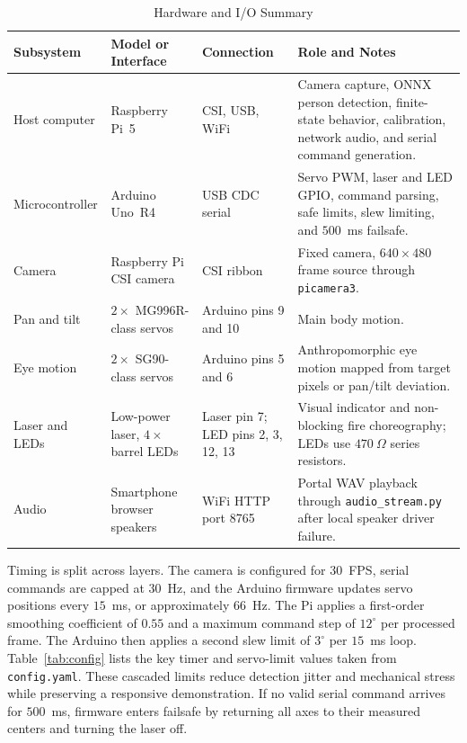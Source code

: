\documentclass[lettersize,journal]{IEEEtran}
\begin{document}
\begin{table}[!t]
\caption{Hardware and I/O Summary}
\label{tab:hardware}
\centering
\footnotesize
\renewcommand{\arraystretch}{1.12}
\begin{tabular}{|p{}|p{}|p{}|p{}|}
\hline
\textbf{Subsystem} & \textbf{Model or Interface} & \textbf{Connection} & \textbf{Role and Notes}\\
\hline
Host computer & Raspberry Pi~5 & CSI, USB, WiFi & Camera capture, ONNX person detection, finite-state behavior, calibration, network audio, and serial command generation.\\
\hline
Microcontroller & Arduino Uno~R4 & USB CDC serial & Servo PWM, laser and LED GPIO, command parsing, safe limits, slew limiting, and $500$~ms failsafe.\\
\hline
Camera & Raspberry Pi CSI camera & CSI ribbon & Fixed camera, $640\times480$ frame source through \texttt{picamera3}.\\
\hline
Pan and tilt & $2\times$ MG996R-class servos & Arduino pins 9 and 10 & Main body motion.\\
\hline
Eye motion & $2\times$ SG90-class servos & Arduino pins 5 and 6 & Anthropomorphic eye motion mapped from target pixels or pan/tilt deviation.\\
\hline
Laser and LEDs & Low-power laser, $4\times$ barrel LEDs & Laser pin 7; LED pins 2, 3, 12, 13 & Visual indicator and non-blocking fire choreography; LEDs use $470~\Omega$ series resistors.\\
\hline
Audio & Smartphone browser speakers & WiFi HTTP port 8765 & Portal WAV playback through \texttt{audio\_stream.py} after local speaker driver failure.\\
\hline
\end{tabular}
\end{table}

Timing is split across layers. The camera is configured for $30$~FPS, serial commands are capped at $30$~Hz, and the Arduino firmware updates servo positions every $15$~ms, or approximately $66$~Hz. The Pi applies a first-order smoothing coefficient of $0.55$ and a maximum command step of $12^\circ$ per processed frame. The Arduino then applies a second slew limit of $3^\circ$ per $15$~ms loop. Table~\ref{tab:config} lists the key timer and servo-limit values taken from \texttt{config.yaml}. These cascaded limits reduce detection jitter and mechanical stress while preserving a responsive demonstration. If no valid serial command arrives for $500$~ms, firmware enters failsafe by returning all axes to their measured centers and turning the laser off.
\end{document}
